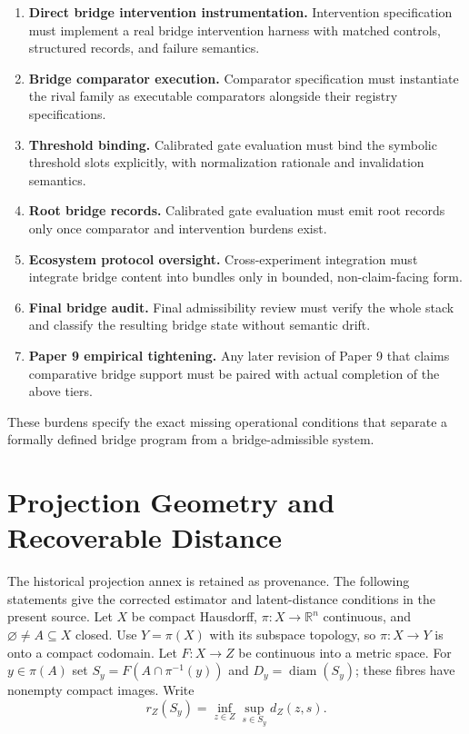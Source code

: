 \documentclass[11pt,a4paper]{article}
\theoremstyle{definition}
\begin{document}
\begin{enumerate}[leftmargin=1.5em]
\item \textbf{Direct bridge intervention instrumentation.} Intervention specification must implement a real bridge intervention harness with matched controls, structured records, and failure semantics.
\item \textbf{Bridge comparator execution.} Comparator specification must instantiate the rival family as executable comparators alongside their registry specifications.
\item \textbf{Threshold binding.} Calibrated gate evaluation must bind the symbolic threshold slots explicitly, with normalization rationale and invalidation semantics.
\item \textbf{Root bridge records.} Calibrated gate evaluation must emit root records only once comparator and intervention burdens exist.
\item \textbf{Ecosystem protocol oversight.} Cross-experiment integration must integrate bridge content into bundles only in bounded, non-claim-facing form.
\item \textbf{Final bridge audit.} Final admissibility review must verify the whole stack and classify the resulting bridge state without semantic drift.
\item \textbf{Paper 9 empirical tightening.} Any later revision of Paper 9 that claims comparative bridge support must be paired with actual completion of the above tiers.
\end{enumerate}

These burdens specify the exact missing operational conditions that separate a formally defined bridge program from a bridge-admissible system.

\section{Projection Geometry and Recoverable Distance}

The historical projection annex is retained as provenance. The following statements give the corrected estimator and latent-distance conditions in the present source. Let $X$ be compact Hausdorff, $\pi:X\to\mathbb R^n$ continuous, and $\varnothing\ne A\subseteq X$ closed. Use $Y=\pi(X)$ with its subspace topology, so $\pi:X\to Y$ is onto a compact codomain. Let $F:X\to Z$ be continuous into a metric space. For $y\in\pi(A)$ set $S_y=F(A\cap\pi^{-1}(y))$ and $D_y=\operatorname{diam}(S_y)$; these fibres have nonempty compact images. Write
\[
 r_Z(S_y)=\inf_{z\in Z}\sup_{s\in S_y}d_Z(z,s).
\]
\end{document}
